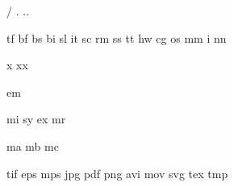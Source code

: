       {/}
        {.}
         {..}


 {tf}
 {bf}
 {bs}
 {bi}
 {sl}
 {it}
 {sc}
 {rm}
 {ss}
 {tt}
 {hw}
 {cg}
 {os}
 {mm}
  {i}
 {nn}

  {x}
 {xx}

 {em}

 {mi}
 {sy}
 {ex}
 {mr}

 {ma}
 {mb}
 {mc}


  {tif}
  {eps}
  {mps}
  {jpg}
  {pdf}
  {png}
  {avi}
  {mov}
  {svg}
  {tex}
  {tmp}


\selectinterface



\protect

\endinput
